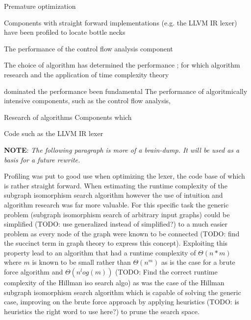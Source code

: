  Premature optimization









Components with straight forward implementations (e.g. the LLVM IR lexer) have been profiled to locate bottle necks

The performance of the control flow analysis component

The choice of algorithm has determined the performance ; for which algorithm research and the application of time complexity theory

dominated the performance  been fundamental The performance of algoritmically intensive components, such as the control flow analysis,



Research of algorithms Components which

Code such as the LLVM IR lexer





























\textbf{NOTE}: \textit{The following paragraph is more of a brain-dump. It will be used as a basis for a future rewrite.}

Profiling was put to good use when optimizing the lexer, the code base of which is rather straight forward. When estimating the runtime complexity of the subgraph isomorphism search algorithm however the use of intuition and algorithm research was far more valuable. For this specific task the generic problem (subgraph isomorphism search of arbitrary input graphs) could be simplified (TODO: use generalized instead of simplified?) to a much easier problem as every node of the graph were known to be connected (TODO: find the succinct term in graph theory to express this concept). Exploiting this property lead to an algorithm that had a runtime complexity of $ \Theta(n*m) $ where $ m $ is known to be small rather than $ \Theta(n^m) $ as is the case for a brute force algorithm and $ \Theta(n^log(m)) $ (TODO: Find the correct runtime complexity of the Hillman iso search algo) as was the case of the Hillman subgraph isomorphism search algorithm which is capable of solving the generic case, improving on the brute force approach by applying heuristics (TODO: is heuristics the right word to use here?) to prune the search space.


